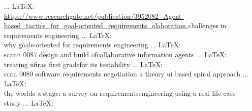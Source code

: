 \begin{thebibliography}{99}
\bibitem{ } ... \LaTeX:\\ \url{https://www.researchgate.net/publication/3952082_Agent-based_tactics_for_goal-oriented_requirements_elaboration }
challenges in requirements engineering
\bibitem{ } ... \LaTeX:\\ \url{ }
why goals-oriented for requirements engineering
\bibitem{ } ... \LaTeX:\\ \url{ }
scann 0087
design and build ofcollaborative information agents
\bibitem{ } ... \LaTeX:\\ \url{ }
treating nfiras first gradefor its testability
\bibitem{ } ... \LaTeX:\\ \url{ }
scan 0089
software requirements negotiation a theory ui based spiral approach
\bibitem{ } ... \LaTeX:\\ \url{ }
the worlds a stage: a survey on requirementsengineering using a real life case study
\bibitem{ } ... \LaTeX:\\ \url{ }


\end{thebibliography}
